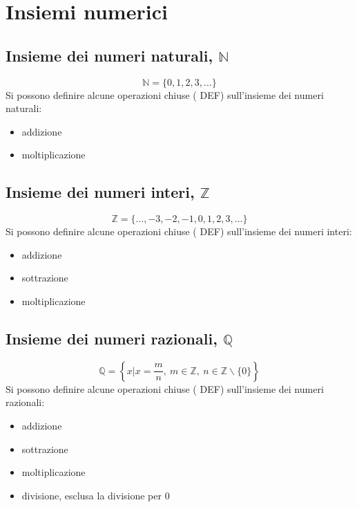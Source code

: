 \chapter{Insiemi numerici}
\section{Insieme dei numeri naturali, $\mathbb{N}$}
\begin{equation}
    \mathbb{N} = \{ 0, 1, 2, 3, \dots \}
\end{equation}
Si possono definire alcune operazioni chiuse ({\color{red} DEF}) sull'insieme dei numeri naturali:
\begin{itemize}
    \item addizione
    \item moltiplicazione
\end{itemize}

\section{Insieme dei numeri interi, $\mathbb{Z}$}
\begin{equation}
    \mathbb{Z} = \{ \dots, -3, -2, -1, 0, 1, 2, 3, \dots \}
\end{equation}
Si possono definire alcune operazioni chiuse ({\color{red} DEF}) sull'insieme dei numeri interi:
\begin{itemize}
    \item addizione
    \item sottrazione
    \item moltiplicazione
\end{itemize}

\section{Insieme dei numeri razionali, $\mathbb{Q}$}
\begin{equation}
    \mathbb{Q} = \left\{ x | x = \dfrac{m}{n}, \ m \in \mathbb{Z}, \ n \in \mathbb{Z}\backslash\{0\} \right\}
\end{equation}
Si possono definire alcune operazioni chiuse ({\color{red} DEF}) sull'insieme dei numeri razionali:
\begin{itemize}
    \item addizione
    \item sottrazione
    \item moltiplicazione
    \item divisione, esclusa la divisione per $0$
\end{itemize}

